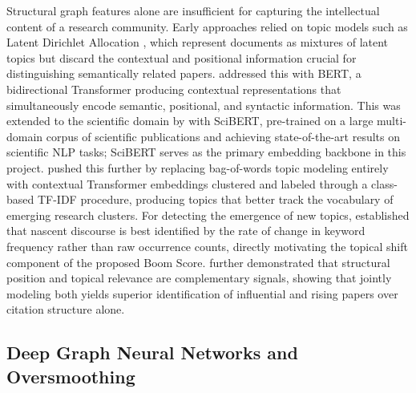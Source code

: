 \documentclass[a4paper,12pt]{article}
\begin{document}
Structural graph features alone are insufficient for capturing the intellectual content of a research community. Early approaches relied on topic models such as Latent Dirichlet Allocation \parencite{jelodar_latent_2019}, which represent documents as mixtures of latent topics but discard the contextual and positional information crucial for distinguishing semantically related papers. \parencite{devlin_bert_2019} addressed this with BERT, a bidirectional Transformer producing contextual representations that simultaneously encode semantic, positional, and syntactic information. This was extended to the scientific domain by \parencite{beltagy_scibert_2019} with SciBERT, pre-trained on a large multi-domain corpus of scientific publications and achieving state-of-the-art results on scientific NLP tasks; SciBERT serves as the primary embedding backbone in this project. \parencite{grootendorst_bertopic_2022} pushed this further by replacing bag-of-words topic modeling entirely with contextual Transformer embeddings clustered and labeled through a class-based TF-IDF procedure, producing topics that better track the vocabulary of emerging research clusters. For detecting the emergence of new topics, \parencite{kleinberg_bursty_nodate} established that nascent discourse is best identified by the rate of change in keyword frequency rather than raw occurrence counts, directly motivating the topical shift component of the proposed Boom Score. \parencite{huang_topic-sensitive_2018} further demonstrated that structural position and topical relevance are complementary signals, showing that jointly modeling both yields superior identification of influential and rising papers over citation structure alone.

\subsection{Deep Graph Neural Networks and Oversmoothing }
\end{document}
